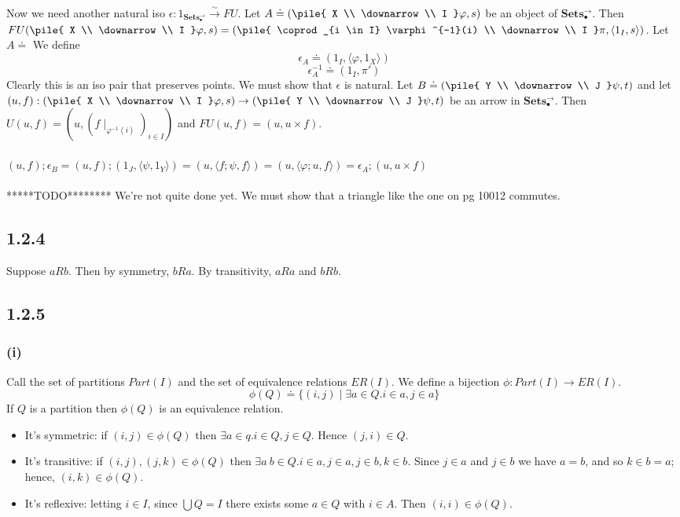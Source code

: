 \documentclass{article}
\newcommand{\mbf}{\mathbf}
\newcommand{\vrt}[2]{
\pile{
#1 \\
\downarrow \\
#2
}
}
\begin{document}
Now we need another natural iso $\epsilon : 1_{\mbf{Sets_{\bullet}^{\to}}} \overset{\sim}{\longrightarrow} FU$.
Let $A \doteq (\vrt{X}{I}\varphi,s)$ be an object of $\mbf{Sets_{\bullet}^{\to}}$.
Then $FU(\vrt{X}{I}\varphi,s) = (\vrt{\coprod_{i \in I} \varphi^{-1}(i)}{I}\pi, \langle 1_I, s \rangle)$.
Let $A \doteq $ We define
$$\epsilon_{A} \doteq (1_I, \langle \varphi, 1_X\rangle) $$
$$\epsilon^{-1}_A \doteq (1_I, \pi') $$
Clearly this is an iso pair that preserves points. We must show that $\epsilon$ is natural.
Let $B \doteq (\vrt{Y}{J}\psi,t)$ and let $(u,f) : (\vrt{X}{I}\varphi,s) \to (\vrt{Y}{J}\psi,t)$ be an arrow in 
$\mbf{Sets^{\to}_{\bullet}}$.
Then $U(u,f) = (u,(f\mid_{\varphi^{-1}(i)})_{i \in I})$ and $FU(u,f) = (u, u \times f)$.\\~\\
$(u,f);\epsilon_B = (u,f);(1_J, \langle \psi, 1_Y \rangle) = (u, \langle f;\psi, f \rangle)
= (u, \langle \varphi;u, f \rangle) = \epsilon_A;(u, u \times f)$
\\~\\
*****TODO********
We're not quite done yet. We must show that a triangle like the one on pg 10012 commutes.

\subsection*{1.2.4}

Suppose $aRb$. Then by symmetry, $bRa$. By transitivity, $aRa$ and $bRb$.

\subsection*{1.2.5}

\subsubsection*{(i)}

Call the set of partitions $Part(I)$ and the set of equivalence relations $ER(I)$.
We define a bijection $\phi : Part(I) \to ER(I)$.
$$\phi(Q) \doteq \{ (i,j) \mid \exists a \in Q. i \in a, j \in a \}$$
If $Q$ is a partition then $\phi(Q)$ is an equivalence relation.
\begin{itemize}
\item It's symmetric: if $(i,j) \in \phi(Q)$ then $\exists a \in q. i \in Q, j \in Q$. Hence $(j,i) \in Q$.
\item It's transitive: if $(i,j), (j,k) \in \phi(Q)$ then $\exists a~b \in Q. i \in a, j \in a, j \in b, k \in b$.
 Since $j \in a$ and $j \in b$ we have $a = b$, and so $k \in b = a$; hence, $(i,k) \in \phi(Q)$.
\item It's reflexive: letting $i \in I$, since $\bigcup Q = I$ there exists some $a \in Q$ with $i \in A$.
 Then $(i,i) \in \phi(Q)$.
\end{itemize}
\end{document}
